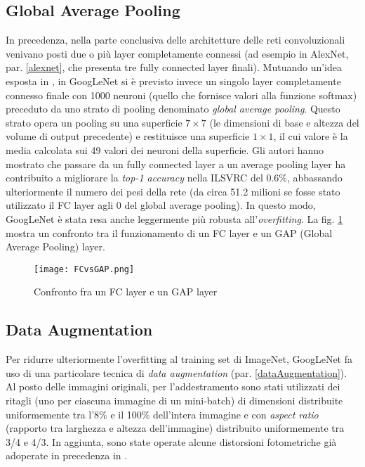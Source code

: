 \subsection{Global Average Pooling}
\label{globalAveragePooling}
In precedenza, nella parte conclusiva delle architetture delle reti convoluzionali venivano posti due o più layer completamente connessi (ad esempio in AlexNet, par. \ref{alexnet}, che presenta tre fully connected layer finali).
Mutuando un'idea esposta in \cite{NiN}, in GoogLeNet si è previsto invece un singolo layer completamente connesso finale con 1000 neuroni (quello che fornisce valori alla funzione softmax) preceduto da uno strato di pooling denominato \textit{global average pooling}. Questo strato opera un pooling su una superficie $7\times 7$ (le dimensioni di base e altezza del volume di output precedente) e restituisce una superficie $1\times 1$, il cui valore è la media calcolata sui 49 valori dei neuroni della superficie. Gli autori hanno mostrato che passare da un fully connected layer a un average pooling layer ha contribuito a migliorare la \textit{top-1 accuracy} nella ILSVRC del 0.6\%, abbassando ulteriormente il numero dei pesi della rete (da circa 51.2 milioni se fosse stato utilizzato il FC layer agli 0 del global average pooling). In questo modo, GoogLeNet è stata resa anche leggermente più robusta all'\textit{overfitting}.
La fig. \ref{fig:FCvsGAP} mostra un confronto tra il funzionamento di un FC layer e un GAP (Global Average Pooling) layer.

\begin{figure}[h]
\centering
\texttt{[image: FCvsGAP.png]}
\caption{Confronto fra un FC layer e un GAP layer}
\label{fig:FCvsGAP}
\end{figure}

\subsection{Data Augmentation}
\label{googlenetAugmentation}
Per ridurre ulteriormente l'overfitting al training set di ImageNet, GoogLeNet fa uso di una particolare tecnica di \textit{data augmentation} (par. \ref{dataAugmentation}). Al posto delle immagini originali, per l'addestramento sono stati utilizzati dei ritagli (uno per ciascuna immagine di un mini-batch) di dimensioni distribuite uniformemente tra l'8\% e il 100\% dell'intera immagine e con \textit{aspect ratio} (rapporto tra larghezza e altezza dell'immagine) distribuito uniformemente tra 3/4 e 4/3. In aggiunta, sono state operate alcune distorsioni fotometriche già adoperate in precedenza in \cite{photometric}.

